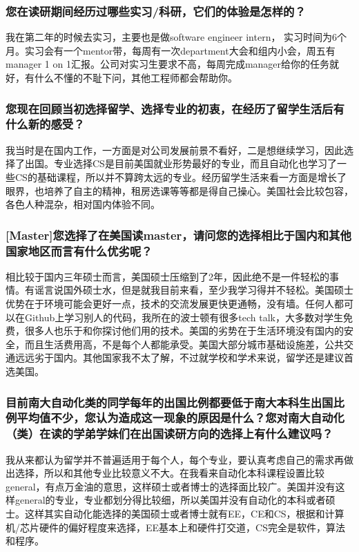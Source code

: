 \documentclass[a4paper,UTF8]{book}
\begin{document}
    \subsubsection*{您在读研期间经历过哪些实习/科研，它们的体验是怎样的？}
    我在第二年的时候去实习，主要也是做software engineer intern， 实习时间为6个月。实习会有一个mentor带，每周有一次department大会和组内小会，周五有manager 1 on 1汇报。公司对实习生要求不高，每周完成manager给你的任务就好，有什么不懂的不耻下问，其他工程师都会帮助你。

    \subsubsection*{您现在回顾当初选择留学、选择专业的初衷，在经历了留学生活后有什么新的感受？}
    我当时是在国内工作，一方面是对公司发展前景不看好，二是想继续学习，因此选择了出国。专业选择CS是目前美国就业形势最好的专业，而且自动化也学习了一些CS的基础课程，所以并不算跨太远的专业。经历留学生活来看一方面是增长了眼界，也培养了自主的精神，租房选课等等都是得自己操心。美国社会比较包容，各色人种混杂，相对国内体验不同。

    \subsubsection*{[Master]您选择了在美国读master，请问您的选择相比于国内和其他国家地区而言有什么优劣呢？}
    相比较于国内三年硕士而言，美国硕士压缩到了2年，因此绝不是一件轻松的事情。有谣言说国外硕士水，但是就我目前来看，至少我学习得并不轻松。美国硕士优势在于环境可能会更好一点，技术的交流发展更快更通畅，没有墙。任何人都可以在Github上学习别人的代码，我所在的波士顿有很多tech talk，大多数对学生免费，很多人也乐于和你探讨他们用的技术。美国的劣势在于生活环境没有国内的安全，而且生活费用高，不是每个人都能承受。美国大部分城市基础设施差，公共交通远远劣于国内。其他国家我不太了解，不过就学校和学术来说，留学还是建议首选美国。

    \subsubsection*{目前南大自动化类的同学每年的出国比例都要低于南大本科生出国比例平均值不少，您认为造成这一现象的原因是什么？您对南大自动化（类）在读的学弟学妹们在出国读研方向的选择上有什么建议吗？}
    我从来都认为留学并不普遍适用于每个人，每个专业，要认真考虑自己的需求再做出选择，所以和其他专业比较意义不大。在我看来自动化本科课程设置比较general，有点万金油的意思，这样硕士或者博士的选择面比较广。美国并没有这样general的专业，专业都划分得比较细，所以美国并没有自动化的本科或者硕士。这样其实自动化能选择的美国硕士或者博士就有EE，CE和CS，根据和计算机/芯片硬件的偏好程度来选择，EE基本上和硬件打交道，CS完全是软件，算法和程序。
\end{document}
